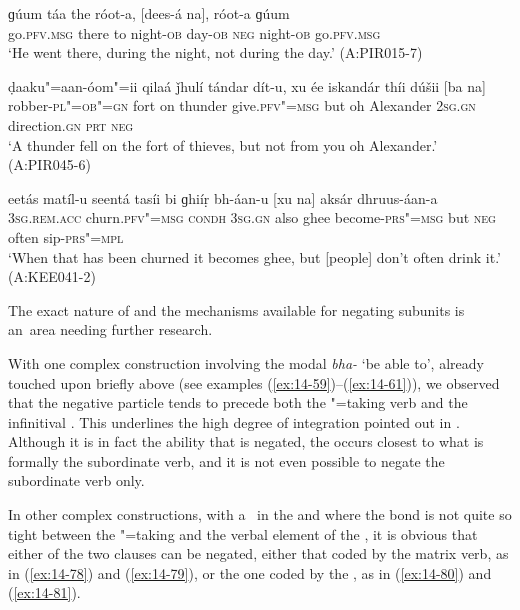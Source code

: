 \begin{exe}
\ex
\label{ex:14-75}
\gll ɡúum táa the róot-a, [dees-á na], róot-a  ɡúum \\
go.\textsc{pfv.msg} there to night-\textsc{ob} day-\textsc{ob} \textsc{neg} night-\textsc{ob}  go.\textsc{pfv.msg}  \\
\glt `He went there, during the night, not during the day.' (A:PIR015-7)

\ex
\label{ex:14-76}
\gll ḍaaku"=aan-óom"=ii qilaá ǰhulí tándar dít-u, xu ée iskandár thíi dúšii [ba na] \\
robber-\textsc{pl"=ob"=gn} fort on thunder give.\textsc{pfv"=msg} but oh Alexander \textsc{2sg.gn} direction.\textsc{gn} \textsc{prt} \textsc{neg} \\
\glt `A thunder fell on the fort of thieves, but not from you oh Alexander.' (A:PIR045-6)

\ex
\label{ex:14-77}
\gll eetás matíl-u seentá tasíi bi ɡhiíṛ  bh-áan-u [xu na] aksár dhruus-áan-a \\
\textsc{3sg.rem.acc} churn.\textsc{pfv"=msg} \textsc{condh} \textsc{3sg.gn} also ghee  become-\textsc{prs"=msg} but \textsc{neg} often sip-\textsc{prs"=mpl}  \\
\glt `When that has been churned it becomes ghee, but [people] don't often drink it.' (A:KEE041-2)
\end{exe}

The exact nature of and the mechanisms available for negating subunits is an~area needing further research.


 With one complex construction involving the modal \textit{bha-} `be able to', already touched upon briefly above (see examples (\ref{ex:14-59})--(\ref{ex:14-61})), we observed that the negative particle tends to precede both the "=taking verb and the infinitival . This underlines the high degree of  integration pointed out in . Although it is in fact the ability that is negated, the  occurs closest to what is formally the subordinate verb, and it is not even possible to negate the subordinate verb only.


In other complex constructions, with a~ in the  and where the bond is not quite so tight between the "=taking  and the verbal element of the , it is obvious that either of the two clauses can be negated, either that coded by the matrix verb, as in (\ref{ex:14-78}) and (\ref{ex:14-79}), or the one coded by the , as in (\ref{ex:14-80}) and (\ref{ex:14-81}). 

